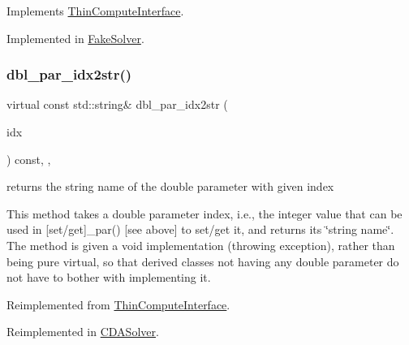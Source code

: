 Implements \mbox{\hyperlink{class_s_m_spp__di__unipi__it_1_1_thin_compute_interface_a00fd6363d98ea46bcc273842b327d050}{Thin\+Compute\+Interface}}.



Implemented in \mbox{\hyperlink{class_s_m_spp__di__unipi__it_1_1_fake_solver_afc8ff54ab05d22f4cca0fb0bfbeb7a49}{Fake\+Solver}}.

\mbox{\label{class_s_m_spp__di__unipi__it_1_1_solver_a93f1297e7910e91cc18b303376191026}} 
\subsubsection{\texorpdfstring{dbl\+\_\+par\+\_\+idx2str()}{dbl\_par\_idx2str()}}
{\footnotesize\ttfamily virtual const std\+::string\& dbl\+\_\+par\+\_\+idx2str (\begin{DoxyParamCaption}\item[{const \mbox{\hyperlink{class_s_m_spp__di__unipi__it_1_1_thin_compute_interface_aa3d710629ad8c434286726ad810c3b47}{idx\+\_\+type}}}]{idx }\end{DoxyParamCaption}) const\hspace{0.3cm}{\ttfamily [inline]}, {\ttfamily [override]}, {\ttfamily [virtual]}}



returns the string name of the double parameter with given index 

This method takes a double parameter index, i.\+e., the integer value that can be used in \mbox{[}set/get\mbox{]}\+\_\+par() \mbox{[}see above\mbox{]} to set/get it, and returns its \char`\"{}string name\char`\"{}. The method is given a void implementation (throwing exception), rather than being pure virtual, so that derived classes not having any double parameter do not have to bother with implementing it. 

Reimplemented from \mbox{\hyperlink{class_s_m_spp__di__unipi__it_1_1_thin_compute_interface_a1be0e4ca13f9253674bc4fa7b67fe40e}{Thin\+Compute\+Interface}}.



Reimplemented in \mbox{\hyperlink{class_s_m_spp__di__unipi__it_1_1_c_d_a_solver_a93f1297e7910e91cc18b303376191026}{C\+D\+A\+Solver}}.


